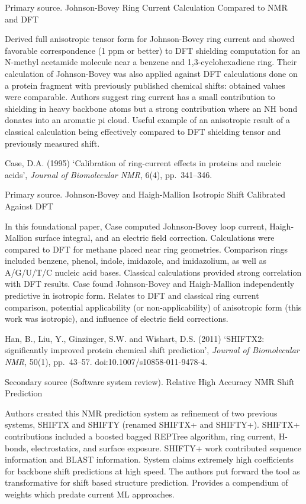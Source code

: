 \documentclass[11pt,a4paper]{article}
\begin{document}
Primary source. Johnson-Bovey Ring Current Calculation Compared to NMR and DFT

Derived full anisotropic tensor form for Johnson-Bovey ring current and showed favorable correspondence (1 ppm or better) to DFT shielding computation for an N-methyl acetamide molecule near a benzene and 1,3-cyclohexadiene ring. Their calculation of Johnson-Bovey was also applied against DFT calculations done on a protein fragment with previously published chemical shifts: obtained values were comparable. Authors suggest ring current has a small contribution to shielding in heavy backbone atoms but a strong contribution where an NH bond donates into an aromatic pi cloud. Useful example of an anisotropic result of a classical calculation being effectively compared to DFT shielding tensor and previously measured shift.

\medskip

Case, D.A. (1995) `Calibration of ring-current effects in proteins and nucleic acids', \textit{Journal of Biomolecular NMR}, 6(4), pp.~341--346.

Primary source. Johnson-Bovey and Haigh-Mallion Isotropic Shift Calibrated Against DFT

In this foundational paper, Case computed Johnson-Bovey loop current, Haigh-Mallion surface integral, and an electric field correction. Calculations were compared to DFT for methane placed near ring geometries. Comparison rings included benzene, phenol, indole, imidazole, and imidazolium, as well as A/G/U/T/C nucleic acid bases. Classical calculations provided strong correlation with DFT results. Case found Johnson-Bovey and Haigh-Mallion independently predictive in isotropic form. Relates to DFT and classical ring current comparison, potential applicability (or non-applicability) of anisotropic form (this work was isotropic), and influence of electric field corrections.

\medskip

Han, B., Liu, Y., Ginzinger, S.W. and Wishart, D.S. (2011) `SHIFTX2: significantly improved protein chemical shift prediction', \textit{Journal of Biomolecular NMR}, 50(1), pp.~43--57. doi:10.1007/s10858-011-9478-4.

Secondary source (Software system review). Relative High Accuracy NMR Shift Prediction

Authors created this NMR prediction system as refinement of two previous systems, SHIFTX and SHIFTY (renamed SHIFTX+ and SHIFTY+). SHIFTX+ contributions included a boosted bagged REPTree algorithm, ring current, H-bonds, electrostatics, and surface exposure. SHIFTY+ work contributed sequence information and BLAST information. System claims extremely high coefficients for backbone shift predictions at high speed. The authors put forward the tool as transformative for shift based structure prediction. Provides a compendium of weights which predate current ML approaches.
\end{document}
